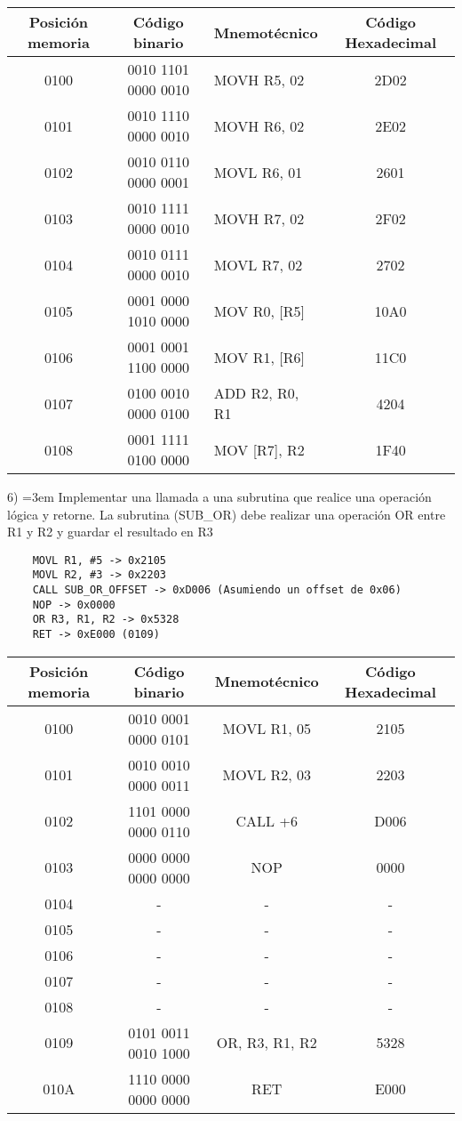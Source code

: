 \documentclass[a4paper,12pt]{article}
\begin{document}
	\begin{tabular}{c|c|l|c}
		\textbf{Posición memoria} & \textbf{Código binario} & \textbf{Mnemotécnico} & \textbf{Código Hexadecimal}\\
		\hline
		0100 & 0010 1101 0000 0010 & MOVH R5, 02 & 2D02 \\
		0101 & 0010 1110 0000 0010 & MOVH R6, 02 & 2E02 \\
		0102 & 0010 0110 0000 0001 & MOVL R6, 01 & 2601 \\
		0103 & 0010 1111 0000 0010 & MOVH R7, 02 & 2F02 \\
		0104 & 0010 0111 0000 0010 & MOVL R7, 02 & 2702 \\
		0105 & 0001 0000 1010 0000 & MOV R0, [R5] & 10A0 \\
		0106 & 0001 0001 1100 0000 & MOV R1, [R6] & 11C0 \\
		0107 & 0100 0010 0000 0100 & ADD R2, R0, R1 & 4204 \\
		0108 & 0001 1111 0100 0000 & MOV [R7], R2 & 1F40 \\
	\end{tabular}

	6) \hangindent=3em Implementar una llamada a una subrutina que realice una operación lógica y
	retorne. La subrutina (SUB\_OR) debe realizar una operación OR entre R1 y R2 y guardar
	el resultado en R3

	\vspace{0.5cm}

\begin{BVerbatim}
	MOVL R1, #5 -> 0x2105
	MOVL R2, #3 -> 0x2203
	CALL SUB_OR_OFFSET -> 0xD006 (Asumiendo un offset de 0x06)
	NOP -> 0x0000
	OR R3, R1, R2 -> 0x5328
	RET -> 0xE000 (0109)
\end{BVerbatim}
	
	\vspace{0.5cm}
	
	\begin{tabular}{c|c|c|c}
		\textbf{Posición memoria} & \textbf{Código binario} & \textbf{Mnemotécnico} & \textbf{Código Hexadecimal}\\
		\hline
		0100 & 0010 0001 0000 0101 & MOVL R1, 05 & 2105 \\
		0101 & 0010 0010 0000 0011 & MOVL R2, 03 & 2203 \\
		0102 & 1101 0000 0000 0110 & CALL +6 & D006 \\
		0103 & 0000 0000 0000 0000 & NOP & 0000 \\
		0104 & - & - & - \\
		0105 & - & - & - \\
		0106 & - & - & - \\
		0107 & - & - & - \\
		0108 & - & - & - \\
		0109 & 0101 0011 0010 1000 & OR, R3, R1, R2 & 5328 \\
		010A & 1110 0000 0000 0000 & RET & E000 \\				
		
	\end{tabular}
\end{document}
